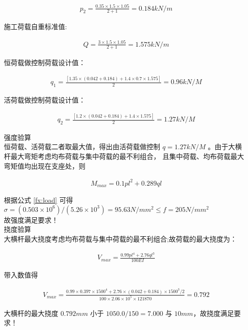 \begin{align}
    p_2=\frac{0.35 \times 1.5\times 1.05}{2+1}=0.184 kN/m
\end{align}

施工荷载自重标准值:

\begin{align}
    Q=\frac{3 \times 1.5\times 1.05}{2+1}=1.575 kN/m
\end{align}

恒荷载做控制荷载设计值：

\begin{align}
    q_1=\frac{[1.35\times(0.042+0.184)+1.4\times 0.7\times 1.575]}{2}=0.96 kN/M
\end{align}

活荷载做控制荷载设计值：

\begin{align}
    q_2=\frac{[1.2\times(0.042+0.184)+1.4\times 1.575]}{2}=1.27 kN/M
\end{align}

 强度验算\\

恒荷载、活荷载二者取最大值，得出由活荷载做控制 $q=1.27 kN/M$ 。由于大横杆最大弯矩考虑均布荷载与集中荷载的最不利组合，
且集中荷载、均布荷载最大弯矩值均出现在支座处，则

\begin{align}
    M_{max}=0.1pl^2+0.289ql
\end{align}

根据公式 \ref{fx:load} 可得 $\sigma =(0.503\times 10^6)/(5.26\times 10^3)=95.63 N/mm^2 \leq f=205 N/mm^2$\\
故强度满足要求！\\

 挠度验算\\

大横杆最大挠度考虑均布荷载与集中荷载的最不利组合;故荷载的最大挠度为：

\begin{align}
    V_{max}=\frac{0.99pl^4+2.76ql^3}{100EI}
\end{align}

带入数值得

\begin{align}
    V_{max}=\frac{0.99\times 0.397\times 1500^4+2.76\times (0.042+0.184)\times 1500^3/2}{100\times 2.06\times 10^5\times 121870}=0.792
\end{align}

大横杆的最大挠度 $0.792mm$ 小于 $1050.0/150=7.000$ 与 $10mm$，故挠度满足要求！ \\

